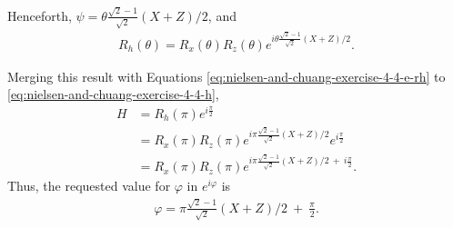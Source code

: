 Henceforth, $\psi = \theta \frac{\sqrt2 - 1}{\sqrt 2} (X + Z) / 2$, and
\begin{align}
    R_h(\theta) = R_x(\theta) R_z(\theta) e^{i \theta \frac{\sqrt2 - 1}{\sqrt 2} (X + Z) / 2}.
\end{align}

Merging this result with Equations
\ref{eq:nielsen-and-chuang-exercise-4-4-e-rh} to \ref{eq:nielsen-and-chuang-exercise-4-4-h},
\begin{align}
    H &= R_h(\pi) e^{i \frac \pi 2} \\
    &= R_x(\pi) R_z(\pi) e^{i \pi \frac{\sqrt2 - 1}{\sqrt 2} (X + Z) / 2} e^{i \frac \pi 2} \\
    &= R_x(\pi) R_z(\pi) e^{i \pi \frac{\sqrt2 - 1}{\sqrt 2} (X + Z) / 2\ +\ i \frac \pi 2}.
\end{align}
Thus, the requested value for $\varphi$ in $e^{i \varphi}$ is
\begin{align}
    \varphi = \pi \frac{\sqrt2 - 1}{\sqrt 2} (X + Z) / 2\ +\ \frac \pi 2.
\end{align}